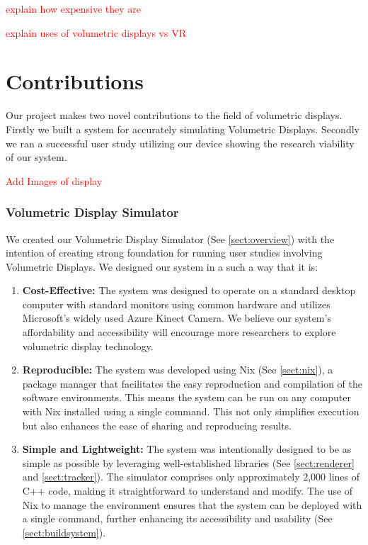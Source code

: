 \textcolor{red}{explain how expensive they are}

\textcolor{red}{explain uses of volumetric displays vs VR}

\section{Contributions}

Our project makes two novel contributions to the field of volumetric displays. Firstly we built a system for accurately simulating Volumetric Displays. Secondly we ran a successful user study utilizing our device showing the research viability of our system. 

\textcolor{red}{Add Images of display}

\subsubsection{Volumetric Display Simulator}
We created our Volumetric Display Simulator (See \ref{sect:overview}) with the intention of creating strong foundation for running user studies involving Volumetric Displays. We designed our system in a such a way that it is: 

\begin{enumerate}
    \item \textbf{Cost-Effective:} The system was designed to operate on a standard desktop computer with standard monitors using common hardware and utilizes Microsoft's widely used Azure Kinect Camera. We believe our system's affordability and accessibility will encourage more researchers to explore volumetric display technology.

    \item \textbf{Reproducible:} The system was developed using Nix (See \ref{sect:nix}), a package manager that facilitates the easy reproduction and compilation of the software environments. This means the system can be run on any computer with Nix installed using a single command. This not only simplifies execution but also enhances the ease of sharing and reproducing results.

    \item \textbf{Simple and Lightweight:} The system was intentionally designed to be as simple as possible by leveraging well-established libraries (See \ref{sect:renderer} and \ref{sect:tracker}). The simulator comprises only approximately 2,000 lines of C++ code, making it straightforward to understand and modify. The use of Nix to manage the environment ensures that the system can be deployed with a single command, further enhancing its accessibility and usability (See \ref{sect:buildsystem}).
\end{enumerate}

